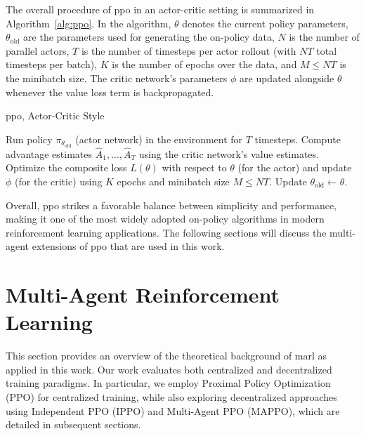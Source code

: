 The overall procedure of \gls{ppo} in an actor-critic setting is summarized in Algorithm~\ref{alg:ppo}. In the algorithm, \(\theta\) denotes the current policy parameters, \(\theta_{\text{old}}\) are the parameters used for generating the on-policy data, \(N\) is the number of parallel actors, \(T\) is the number of timesteps per actor rollout (with \(NT\) total timesteps per batch), \(K\) is the number of epochs over the data, and \(M \le NT\) is the minibatch size. The critic network's parameters \(\phi\) are updated alongside \(\theta\) whenever the value loss term is backpropagated.

\begin{algorithm}[H]
\caption{\gls{ppo}, Actor-Critic Style}
\label{alg:ppo}
\begin{algorithmic}[1]
        \State Run policy \(\pi_{\theta_{\text{old}}}\) (actor network) in the environment for \(T\) timesteps.
        \State Compute advantage estimates \(\hat{A}_1, \dots, \hat{A}_T\) using the critic network's value estimates.
    \EndFor
    \State Optimize the composite loss \(L(\theta)\) with respect to \(\theta\) (for the actor) and update \(\phi\) (for the critic) using \(K\) epochs and minibatch size \(M \le NT\).
    \State Update \(\theta_{\text{old}} \leftarrow \theta\).
\EndFor
\end{algorithmic}
\end{algorithm}

Overall, \gls{ppo} strikes a favorable balance between simplicity and performance, making it one of the most widely adopted on-policy algorithms in modern reinforcement learning applications. The following sections will discuss the multi-agent extensions of \gls{ppo} that are used in this work.
\section{Multi-Agent Reinforcement Learning}
This section provides an overview of the theoretical background of \gls{marl} as applied in this work. Our work evaluates both centralized and decentralized training paradigms. In particular, we employ Proximal Policy Optimization (PPO) for centralized training, while also exploring decentralized approaches using Independent PPO (IPPO) and Multi-Agent PPO (MAPPO), which are detailed in subsequent sections.


